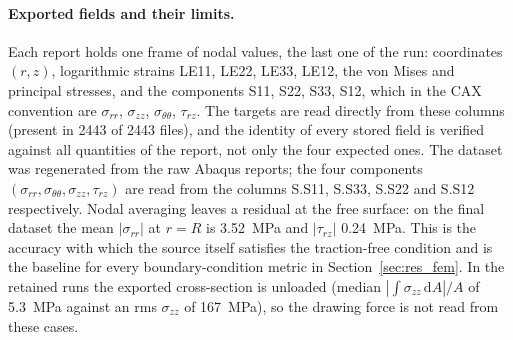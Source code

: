 \documentclass[subscriptcorrection,upint,varvw,barcolor=Goldenrod3,mathalfa=cal=euler,balance,hyphenate,french,pdf-a]{asmejour} %
\begin{document}

\paragraph{Exported fields and their limits.}
Each report holds one frame of nodal values, the last one of the run: coordinates $(r,z)$, logarithmic strains LE11, LE22, LE33, LE12, the von Mises and principal stresses, and the components S11, S22, S33, S12, which in the CAX convention are $\sigma_{rr}$, $\sigma_{zz}$, $\sigma_{\theta\theta}$, $\tau_{rz}$. %
The targets are read directly from these columns (present in 2443 of 2443 files), and the identity of every stored field is verified against all quantities of the report, not only the four expected ones. %
The dataset was regenerated from the raw Abaqus reports; the four components $(\sigma_{rr}, \sigma_{\theta\theta}, \sigma_{zz}, \tau_{rz})$ are read from the columns S.S11, S.S33, S.S22 and S.S12 respectively. %
Nodal averaging leaves a residual at the free surface: on the final dataset the mean $|\sigma_{rr}|$ at $r=R$ is 3.52~MPa and $|\tau_{rz}|$ 0.24~MPa. %
This is the accuracy with which the source itself satisfies the traction-free condition and is the baseline for every boundary-condition metric in Section~\ref{sec:res_fem}. %
In the retained runs the exported cross-section is unloaded (median $|\int\sigma_{zz}\,\mathrm{d}A|/A$ of 5.3~MPa against an rms $\sigma_{zz}$ of 167~MPa), so the drawing force is not read from these cases. %
\end{document}
